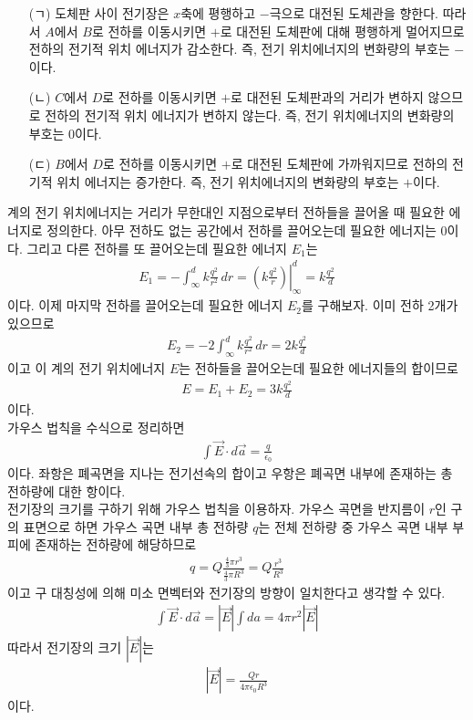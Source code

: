 \documentclass[tightenlines,floatfix,nofootinbib,superscriptaddress,fleqn]{revtex4}
\begin{document}
\begin{itemize}
  \item[(ㄱ)] 도체판 사이 전기장은 $x$축에 평행하고 $-$극으로 대전된 도체관을 향한다.
  따라서 $A$에서 $B$로 전하를 이동시키면 $+$로 대전된 도체판에 대해 평행하게 멀어지므로 
  전하의 전기적 위치 에너지가 감소한다. 즉, 전기 위치에너지의 변화량의 부호는 $-$이다.
  \item[(ㄴ)] $C$에서 $D$로 전하를 이동시키면 $+$로 대전된 도체판과의 거리가 변하지 않으므로
  전하의 전기적 위치 에너지가 변하지 않는다. 즉, 전기 위치에너지의 변화량의 부호는 $0$이다.
  \item[(ㄷ)]  $B$에서 $D$로 전하를 이동시키면 $+$로 대전된 도체판에 가까워지므로
  전하의 전기적 위치 에너지는 증가한다. 즉, 전기 위치에너지의 변화량의 부호는 $+$이다.
\end{itemize}

계의 전기 위치에너지는 거리가 무한대인 지점으로부터 전하들을 끌어올 때 필요한 에너지로 
정의한다. 아무 전하도 없는 공간에서 전하를 끌어오는데 필요한 에너지는 $0$이다. 그리고 다른 
전하를 또 끌어오는데 필요한 에너지 $E_1$는
\begin{align}
  E_1 = -\int _\infty^d k\frac{q^2}{r^2}\,dr 
  = \left.\left(k\frac{q^2}{r}\right)\right| _\infty^d = k\frac{q^2}{d}
\end{align}
이다. 이제 마지막 전하를 끌어오는데 필요한 에너지 $E_2$를 구해보자. 이미 전하 2개가 있으므로
\begin{align}
  E_2 = -2\int _\infty^d k\frac{q^2}{r^2}\,dr  = 2k\frac{q^2}{d}
\end{align}
이고 이 계의 전기 위치에너지 $E$는 전하들을 끌어오는데 필요한 에너지들의 합이므로
\begin{align}
  E=E_1+E_2 = 3k\frac{q^2}{d}
\end{align}
이다.
\\

가우스 법칙을 수식으로 정리하면
\begin{align}
  \int \vec{E}\cdot d\vec{a} =\frac{q}{\epsilon_0}
\end{align}
이다. 좌항은 폐곡면을 지나는 전기선속의 합이고 우항은 폐곡면 내부에 존재하는 총 전하량에 대한
항이다.
\\

전기장의 크기를 구하기 위해 가우스 법칙을 이용하자. 가우스 곡면을 반지름이 $r$인 구의 표면으로
하면 가우스 곡면 내부 총 전하량 $q$는 전체 전하량 중 가우스 곡면 내부 부피에 존재하는 전하량에
해당하므로
\begin{align}
 q = Q\frac{\frac{4}{3}\pi r^3}{\frac{4}{3}\pi R^3}=Q\frac{r^3}{R^3}
\end{align}
이고 구 대칭성에 의해 미소 면벡터와 전기장의 방향이 일치한다고 생각할 수 있다. 
\begin{align}
  \int \vec{E}\cdot d\vec{a} = \left|\vec{E}\right|\int da
  =4\pi r^2\left|\vec{E}\right|
\end{align}
따라서 전기장의 크기 $\left|\vec{E}\right|$는
\begin{align}
  \left|\vec{E}\right| = \frac{Qr}{4\pi \epsilon_0 R^3}
\end{align}
이다.
\\
\end{document}
